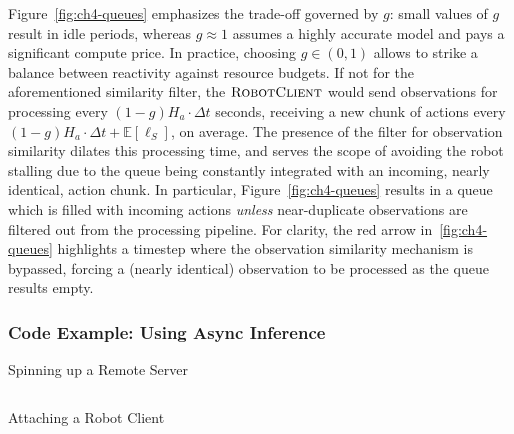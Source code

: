 Figure~\ref{fig:ch4-queues} emphasizes the trade-off governed by \(g\): small values of \( g \) result in idle periods, whereas \(g\approx 1\) assumes a highly accurate model and pays a significant compute price. 
In practice, choosing \(g\in(0,1)\) allows to strike a balance between reactivity against resource budgets.
If not for the aforementioned similarity filter, the \( \textsc{RobotClient} \) would send observations for processing every \( (1 - g) H_a \cdot \Delta t\) seconds, receiving a new chunk of actions every \( (1 - g) H_a \cdot \Delta t + \mathbb E[\ell_S] \), on average. 
The presence of the filter for observation similarity dilates this processing time, and serves the scope of avoiding the robot stalling due to the queue being constantly integrated with an incoming, nearly identical, action chunk. 
In particular, Figure~\ref{fig:ch4-queues} results in a queue which is filled with incoming actions \emph{unless} near-duplicate observations are filtered out from the processing pipeline. 
For clarity, the red arrow in~\ref{fig:ch4-queues} highlights a timestep where the observation similarity mechanism is bypassed, forcing a (nearly identical) observation to be processed as the queue results empty.

\subsubsection{Code Example: Using Async Inference}

\begin{pbox}[label={ex:spinning-up-server}]{Spinning up a Remote Server}
    \inputminted{python}{snippets/ch4/05_policy_server.py}
\end{pbox}

\begin{pbox}[label={ex:latching-a-robot-client}]{Attaching a Robot Client}
    \inputminted{python}{snippets/ch4/06_robot_client.py}
\end{pbox}
